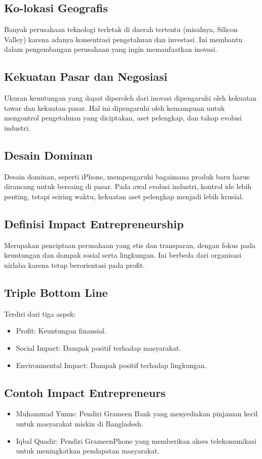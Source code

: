 \documentclass{article}
\begin{document}
\subsection{Ko-lokasi Geografis}
Banyak perusahaan teknologi terletak di daerah tertentu (misalnya, Silicon Valley) karena adanya konsentrasi pengetahuan dan investasi. Ini membantu dalam pengembangan perusahaan yang ingin memanfaatkan inovasi.

\subsection{Kekuatan Pasar dan Negosiasi}
Ukuran keuntungan yang dapat diperoleh dari inovasi dipengaruhi oleh kekuatan tawar dan kekuatan pasar. Hal ini dipengaruhi oleh kemampuan untuk mengontrol pengetahuan yang diciptakan, aset pelengkap, dan tahap evolusi industri.

\subsection{Desain Dominan}
Desain dominan, seperti iPhone, mempengaruhi bagaimana produk baru harus dirancang untuk bersaing di pasar. Pada awal evolusi industri, kontrol ide lebih penting, tetapi seiring waktu, kekuatan aset pelengkap menjadi lebih krusial.

\subsection{Definisi Impact Entrepreneurship}
Merupakan penciptaan perusahaan yang etis dan transparan, dengan fokus pada keuntungan dan dampak sosial serta lingkungan. Ini berbeda dari organisasi nirlaba karena tetap berorientasi pada profit.

\subsection{Triple Bottom Line}
Terdiri dari tiga aspek:
\begin{itemize}
    \item Profit: Keuntungan finansial.
    \item Social Impact: Dampak positif terhadap masyarakat.
    \item Environmental Impact: Dampak positif terhadap lingkungan.
\end{itemize}

\subsection{Contoh Impact Entrepreneurs}
\begin{itemize}
    \item Muhammad Yunus: Pendiri Grameen Bank yang menyediakan pinjaman kecil untuk masyarakat miskin di Bangladesh.
    \item Iqbal Quadir: Pendiri GrameenPhone yang memberikan akses telekomunikasi untuk meningkatkan pendapatan masyarakat.
\end{itemize}
\end{document}
